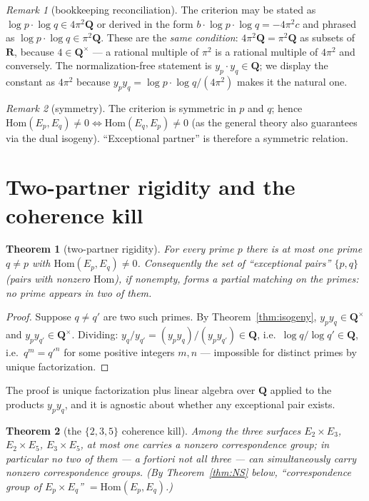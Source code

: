 \documentclass[11pt]{article}
\newtheorem{theorem}{Theorem}
\theoremstyle{definition}
\theoremstyle{remark}
\newtheorem{remark}{Remark}
\newcommand{\Q}{\mathbf{Q}}
\newcommand{\R}{\mathbf{R}}
\newcommand{\Hom}{\mathrm{Hom}}
\begin{document}
\begin{remark}[bookkeeping reconciliation]
\label{rem:bookkeeping}
The criterion may be stated as $\log p\cdot\log q \in 4\pi^2\Q$ or derived in
the form $b\cdot\log p\cdot\log q = -4\pi^2 c$ and phrased as
$\log p\cdot\log q \in \pi^2\Q$. These are the \emph{same condition}:
$4\pi^2\Q = \pi^2\Q$ as subsets of $\R$, because $4 \in \Q^\times$ --- a
rational multiple of $\pi^2$ is a rational multiple of $4\pi^2$ and
conversely. The normalization-free statement is $y_p\cdot y_q \in \Q$; we
display the constant as $4\pi^2$ because
$y_p y_q = \log p\cdot\log q/(4\pi^2)$ makes it the natural one.
\end{remark}

\begin{remark}[symmetry]
\label{rem:symmetry}
The criterion is symmetric in $p$ and $q$; hence
$\Hom(E_p, E_q) \neq 0 \iff \Hom(E_q, E_p) \neq 0$ (as the general theory
also guarantees via the dual isogeny). ``Exceptional partner'' is therefore
a symmetric relation.
\end{remark}

\section{Two-partner rigidity and the coherence kill}
\label{sec:familykill}

\begin{theorem}[two-partner rigidity]
\label{thm:twopartner}
For every prime $p$ there is at most one prime $q \neq p$ with
$\Hom(E_p, E_q) \neq 0$. Consequently the set of ``exceptional pairs''
$\{p, q\}$ (pairs with nonzero $\Hom$), if nonempty, forms a \emph{partial
matching} on the primes: no prime appears in two of them.
\end{theorem}

\begin{proof}
Suppose $q \neq q'$ are two such primes. By Theorem~\ref{thm:isogeny},
$y_p y_q \in \Q^\times$ and $y_p y_{q'} \in \Q^\times$. Dividing:
$y_q / y_{q'} = (y_p y_q)/(y_p y_{q'}) \in \Q$, i.e.\
$\log q / \log q' \in \Q$, i.e.\ $q^m = q'^n$ for some positive integers
$m, n$ --- impossible for distinct primes by unique factorization.
\end{proof}

The proof is unique factorization plus linear algebra over $\Q$ applied to
the products $y_p y_q$, and it is agnostic about whether any exceptional
pair exists.

\begin{theorem}[the $\{2,3,5\}$ coherence kill]
\label{thm:coherence}
Among the three surfaces $E_2\times E_3$, $E_2\times E_5$, $E_3\times E_5$,
at most one carries a nonzero correspondence group; in particular no two of
them --- a fortiori not all three --- can simultaneously carry nonzero
correspondence groups. (By Theorem~\ref{thm:NS} below,
``correspondence group of $E_p\times E_q$'' $= \Hom(E_p, E_q)$.)
\end{theorem}
\end{document}
